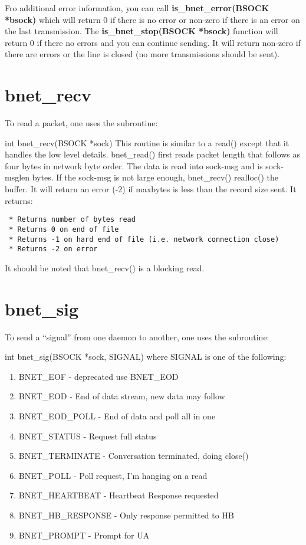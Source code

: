 Fro additional error information, you can call {\bf is\_bnet\_error(BSOCK
*bsock)} which will return 0 if there is no error or non-zero if there is an
error on the last transmission. The {\bf is\_bnet\_stop(BSOCK *bsock)}
function will return 0 if there no errors and you can continue sending. It
will return non-zero if there are errors or the line is closed (no more
transmissions should be sent). 

\section{bnet\_recv}

To read a packet, one uses the subroutine: 

int bnet\_recv(BSOCK *sock) This routine is similar to a read() except that it
handles the low level details. bnet\_read() first reads packet length that
follows as four bytes in network byte order. The data is read into
sock-\gt{}msg and is sock-\gt{}msglen bytes. If the sock-\gt{}msg is not large
enough, bnet\_recv() realloc() the buffer. It will return an error (-2) if
maxbytes is less than the record size sent. It returns: 

\footnotesize
\begin{verbatim}
 * Returns number of bytes read
 * Returns 0 on end of file
 * Returns -1 on hard end of file (i.e. network connection close)
 * Returns -2 on error
\end{verbatim}
\normalsize

It should be noted that bnet\_recv() is a blocking read. 

\section{bnet\_sig}

To send a ``signal'' from one daemon to another, one uses the subroutine: 

int bnet\_sig(BSOCK *sock, SIGNAL) where SIGNAL is one of the following: 

\begin{enumerate}
\item BNET\_EOF - deprecated use BNET\_EOD  
\item BNET\_EOD - End of data stream, new data may follow  
\item BNET\_EOD\_POLL - End of data and poll all in one 
\item BNET\_STATUS - Request full status  
\item BNET\_TERMINATE - Conversation terminated, doing close() 
\item BNET\_POLL - Poll request, I'm hanging on a read 
\item BNET\_HEARTBEAT - Heartbeat Response requested 
\item BNET\_HB\_RESPONSE - Only response permitted to HB 
\item BNET\_PROMPT - Prompt for UA 
   \end{enumerate}

